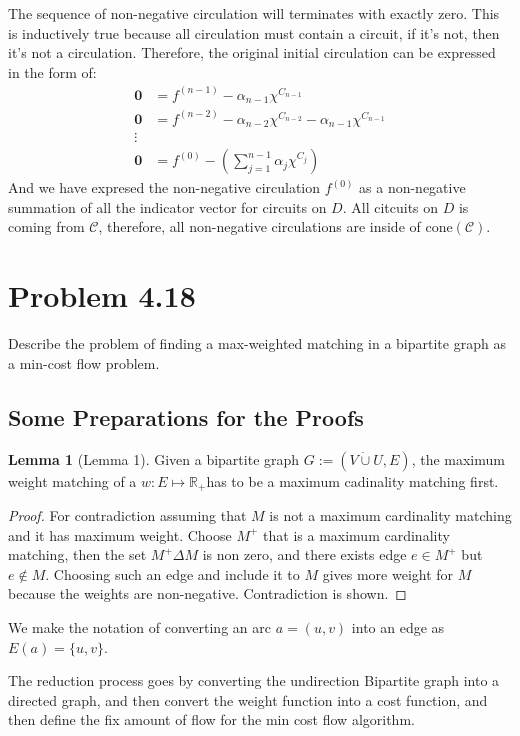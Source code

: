 \documentclass[]{article}
\theoremstyle{definition}
\newtheorem{lemma}{Lemma}[subsection]  %
\begin{document}
        The sequence of non-negative circulation will terminates with exactly zero. This is inductively true because all circulation must contain a circuit, if it's not, then it's not a circulation. Therefore, the original initial circulation can be expressed in the form of: 
        \begin{align}
            \mathbf 0 &= f^{(n - 1)} - \alpha_{n - 1} \chi^{C_{n - 1}} 
            \\
            \mathbf 0 &= f^{(n - 2)} - \alpha_{n - 2} \chi^{C_{n - 2}}  - \alpha_{n - 1} \chi^{C_{n - 1}} 
            \\
            \vdots
            \\
            \mathbf 0 &= f^{(0)} - 
            \left(\sum_{j = 1}^{n - 1}\alpha_j\chi^{C_{j}}\right)
        \end{align}
        And we have expresed the non-negative circulation $f^{(0)}$ as a non-negative summation of all the indicator vector for circuits on $D$. All citcuits on $D$ is coming from $\mathcal C$, therefore, all non-negative circulations are inside of $\text{cone}(\mathcal C)$. 

\section{Problem 4.18}
    Describe the problem of finding a max-weighted matching in a bipartite graph as a min-cost flow problem. 
    \subsection{Some Preparations for the Proofs}
        \begin{lemma}[Lemma 1]\label{lemma:1}
            Given a bipartite graph $G:=(V\dot\cup U, E)$, the maximum weight matching of a $w:E \mapsto \mathbb R_+$has to be a maximum cadinality matching first. 
        \end{lemma}
        \begin{proof}
            For contradiction assuming that $M$ is not a maximum cardinality matching and it has maximum weight. Choose $M^+$ that is a maximum cardinality matching, then the set $M^+\Delta M$ is non zero, and there exists edge $e \in M^+$ but $ e\not \in M$. Choosing such an edge and include it to $M$ gives more weight for $M$ because the weights are non-negative. Contradiction is shown. 
        \end{proof}
        We make the notation of converting an arc $a = (u, v)$ into an edge as $E(a) = \{u, v\}$. 
        \par
        The reduction process goes by converting the undirection Bipartite graph into a directed graph, and then convert the weight function into a cost function, and then define the fix amount of flow for the min cost flow algorithm. 
\end{document}
